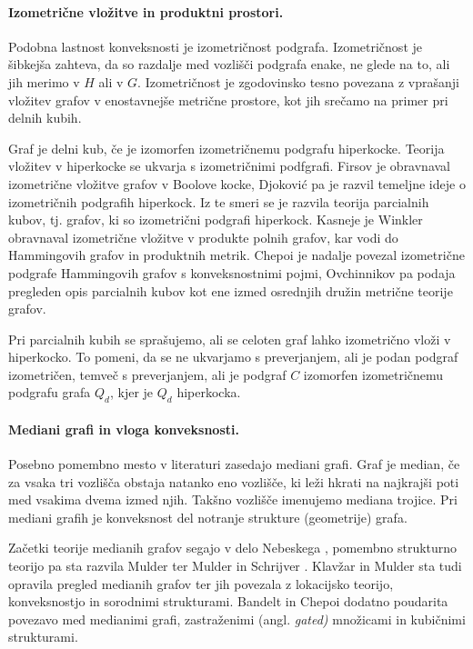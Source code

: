 \documentclass[sigconf
]{acmart}
\theoremstyle{definition}
\begin{document}
\paragraph{Izometrične vložitve in produktni prostori.}
Podobna lastnost konveksnosti je izometričnost podgrafa.
Izometričnost je šibkejša zahteva, da so razdalje med vozlišči podgrafa enake, ne glede na to, ali jih merimo v \(H\) ali v \(G\).
Izometričnost je zgodovinsko tesno povezana z vprašanji vložitev grafov v enostavnejše metrične prostore, kot jih srečamo na primer pri delnih kubih.

Graf je delni kub, če je izomorfen izometričnemu podgrafu hiperkocke.
Teorija vložitev v hiperkocke se ukvarja s izometričnimi podfgrafi.
Firsov \cite{firsov1965isometric} je obravnaval izometrične vložitve grafov v Boolove kocke, Djoković \cite{djokovic1973} pa je razvil temeljne ideje o izometričnih podgrafih hiperkock.
Iz te smeri se je razvila teorija parcialnih kubov, tj. grafov, ki so izometrični podgrafi hiperkock.
Kasneje je Winkler \cite{winkler1984} obravnaval izometrične vložitve v produkte polnih grafov, kar vodi do Hammingovih grafov in produktnih metrik.
Chepoi \cite{chepoi1988isometric} je nadalje povezal izometrične podgrafe Hammingovih grafov s konveksnostnimi pojmi, Ovchinnikov \cite{ovchinnikov2011} pa podaja pregleden opis parcialnih kubov kot ene izmed osrednjih družin metrične teorije grafov.

Pri parcialnih kubih se sprašujemo, ali se celoten graf lahko izometrično vloži v hiperkocko.
To pomeni, da se ne ukvarjamo s preverjanjem, ali je podan podgraf izometričen, temveč s preverjanjem, ali je podgraf \(C\) izomorfen izometričnemu podgrafu grafa \(Q_d\), kjer je \(Q_d\) hiperkocka.

\paragraph{Mediani grafi in vloga konveksnosti.}
Posebno pomembno mesto v literaturi zasedajo mediani grafi.
Graf je median, če za vsaka tri vozlišča obstaja natanko eno vozlišče, ki leži hkrati na najkrajši poti med vsakima dvema izmed njih. Takšno vozlišče imenujemo mediana trojice.
Pri mediani grafih je konveksnost del notranje strukture (geometrije) grafa.

Začetki teorije medianih grafov segajo v delo Nebeskega \cite{nebesky1971median}, pomembno strukturno teorijo pa sta razvila Mulder
\cite{mulder1978} ter Mulder in Schrijver \cite{mulder1979median}.
Klavžar in Mulder sta tudi opravila pregled \cite{klavzar1999median} medianih grafov ter jih povezala z lokacijsko teorijo, konveksnostjo in sorodnimi strukturami.
Bandelt in Chepoi \cite{chepoi2002} dodatno poudarita povezavo med
medianimi grafi, zastraženimi (angl. \emph{gated)} množicami in kubičnimi strukturami.
\end{document}
